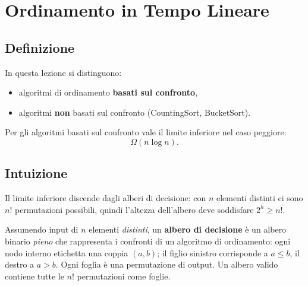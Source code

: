 \section{Ordinamento in Tempo Lineare}

\subsection{Definizione}
In questa lezione si distinguono:
\begin{itemize}
	\item algoritmi di ordinamento \textbf{basati sul confronto},
	\item algoritmi \textbf{non} basati sul confronto (CountingSort, BucketSort).
\end{itemize}

Per gli algoritmi basati sul confronto vale il limite inferiore nel caso peggiore:
\[
\Omega(n\log n).
\]

\subsection{Intuizione}
Il limite inferiore discende dagli alberi di decisione: con $n$ elementi distinti ci sono $n!$ permutazioni possibili, quindi l'altezza dell'albero deve soddisfare $2^h\ge n!$.

\begin{definizione}
	Assumendo input di $n$ elementi \emph{distinti}, un \textbf{albero di decisione} è un albero binario \emph{pieno} che rappresenta i confronti di un algoritmo di ordinamento: ogni nodo interno etichetta una coppia $(a,b)$; il figlio sinistro corrisponde a $a\le b$, il destro a $a>b$. Ogni foglia è una permutazione di output. Un albero valido contiene tutte le $n!$ permutazioni come foglie.
\end{definizione}

